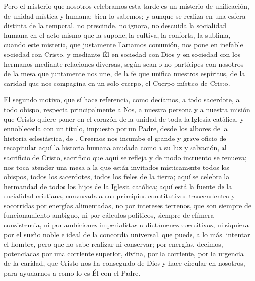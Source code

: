 \begin{body}
Pero el misterio que nosotros celebramos esta tarde es un misterio de unificación, de unidad mística y humana; bien lo sabemos; y aunque se realiza en una esfera distinta de la temporal, no prescinde, no ignora, no descuida la socialidad humana en el acto mismo que la supone, la cultiva, la conforta, la sublima, cuando este misterio, que justamente llamamos comunión, nos pone en inefable sociedad con Cristo, y mediante Él en sociedad con Dios y en sociedad con los hermanos mediante relaciones diversas, según sean o no partícipes con nosotros de la mesa que juntamente nos une, de la fe que unifica nuestros espíritus, de la caridad que nos compagina en un solo cuerpo, el Cuerpo místico de Cristo.

El segundo motivo, que sí hace referencia, como decíamos, a todo sacerdote, a todo obispo, respecta principalmente a Nos, a nuestra persona y a nuestra misión que Cristo quiere poner en el corazón de la unidad de toda la Iglesia católica, y ennoblecerla con un título, impuesto por un Padre, desde los albores de la historia eclesiástica, de . Creemos nos incumbe el grande y grave oficio de recapitular aquí la historia humana anudada como a su luz y salvación, al sacrificio de Cristo, sacrificio que aquí se refleja y de modo incruento se renueva; nos toca atender una mesa a la que están invitados místicamente todos los obispos, todos los sacerdotes, todos los fieles de la tierra; aquí se celebra la hermandad de todos los hijos de la Iglesia católica; aquí está la fuente de la socialidad cristiana, convocada a sus principios constitutivos trascendentes y socorridas por energías alimentadas, no por intereses terrenos, que son siempre de funcionamiento ambiguo, ni por cálculos políticos, siempre de efímera consistencia, ni por ambiciones imperialistas o dictámenes coercitivos, ni siquiera por el sueño noble e ideal de la concordia universal, que puede, a lo más, intentar el hombre, pero que no sabe realizar ni conservar; por energías, decimos, potenciadas por una corriente superior, divina, por la corriente, por la urgencia de la caridad, que Cristo nos ha conseguido de Dios y hace circular en nosotros, para ayudarnos a  como lo es Él con el Padre.


\end{body}

